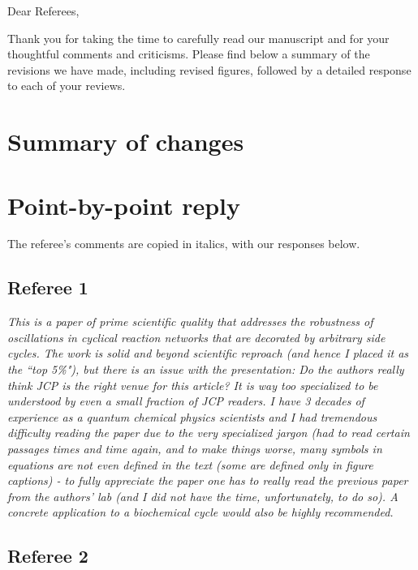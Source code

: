 \documentclass[amsmath, preprintnumbers, 12pt, onecolumn, pre, longbibliograpy]{revtex4-1}
\begin{document}
\thispagestyle{empty}
\noindent Dear Referees,

\vspace{1cm}

Thank you for taking the time to carefully read our manuscript and for your thoughtful comments and criticisms. Please find below a summary of the revisions we have made, including revised figures, followed by a detailed response to each of your reviews.

\section*{Summary of changes}

\pagebreak

\section*{Point-by-point reply}

The referee's comments are copied in italics, with our responses below.

\subsection*{Referee 1}

\textit{ This is a paper of prime scientific quality that addresses the robustness of oscillations in cyclical reaction networks that are decorated by arbitrary side cycles. The work is solid and beyond scientific reproach (and hence I placed it as the ``top 5\%"), but there is an issue with the presentation: Do the authors really think JCP is the right venue for this article? It is way too specialized to be understood by even a small fraction of JCP readers. I have 3 decades of experience as a quantum chemical physics scientists and I had tremendous difficulty reading the paper due to the very specialized jargon (had to read certain passages times and time again, and to make things worse, many symbols in equations are not even defined in the text (some are defined only in figure captions) - to fully appreciate the paper one has to really read the previous paper from the authors' lab (and I did not have the time, unfortunately, to do so). A concrete application to a biochemical cycle would also be highly recommended.}

\subsection*{Referee 2}
\end{document}
